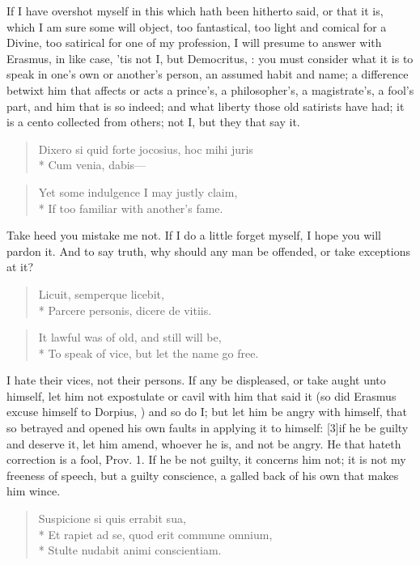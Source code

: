 If I have overshot myself in this which hath been hitherto said, or
that it is, which I am sure some will object, too fantastical, too
light and comical for a Divine, too satirical for one of my profession,
I will presume to answer with Erasmus, in like case, 'tis not I,
but Democritus, : you must consider what it is to speak
in one's own or another's person, an assumed habit and name; a
difference betwixt him that affects or acts a prince's, a
philosopher's, a magistrate's, a fool's part, and him that is so
indeed; and what liberty those old satirists have had; it is a cento
collected from others; not I, but they that say it.
%
\begin{verse}
\textlatin{Dixero si quid forte jocosius, hoc mihi juris}\\*
\textlatin{Cum venia, dabis}---
\end{verse}

\begin{verse}
Yet some indulgence I may justly claim,\\*
If too familiar with another's fame.
\end{verse}

Take heed you mistake me not. If I do a little forget myself, I hope
you will pardon it. And to say truth, why should any man be offended,
or take exceptions at it?
%
\begin{verse}
\textlatin{Licuit, semperque licebit,}\\*
\textlatin{Parcere personis, dicere de vitiis.}
\end{verse}

\begin{verse}
It lawful was of old, and still will be,\\*
To speak of vice, but let the name go free.
\end{verse}

I hate their vices, not their persons. If any be displeased, or take
aught unto himself, let him not expostulate or cavil with him that said
it (so did Erasmus excuse himself to Dorpius, ) and so do I; but let him be angry with himself, that
so betrayed and opened his own faults in applying it to himself:
[3\baselineskip]if he be guilty and deserve it, let him amend, whoever he is, and
not be angry. He that hateth correction is a fool, Prov.  1. If he
be not guilty, it concerns him not; it is not my freeness of speech,
but a guilty conscience, a galled back of his own that makes him wince.
%
\begin{verse}
\textlatin{Suspicione si quis errabit sua,}\\*
\textlatin{Et rapiet ad se, quod erit commune omnium,}\\*
\textlatin{Stulte nudabit animi conscientiam.}
\end{verse}

